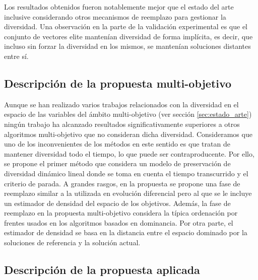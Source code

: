 Los resultados obtenidos fueron notablemente mejor que el estado del arte inclusive considerando otros mecanismos de 
reemplazo para gestionar la diversidad.
%
Una observación en la parte de la validación experimental es que el conjunto de vectores elite mantenían diversidad de 
forma implícita, es decir, que incluso sin forzar la diversidad en los mismos, se mantenían soluciones distantes entre sí.

\subsection{Descripción de la propuesta multi-objetivo}

Aunque se han realizado varios trabajos relacionados con la diversidad en el espacio de las variables del 
ámbito multi-objetivo (ver sección \ref{sec:estado_arte}) ningún trabajo ha alcanzado resultados significativamente superiores 
a otros algoritmos multi-objetivo que no consideran dicha diversidad.
%
Consideramos que uno de los inconvenientes de los métodos en este sentido es que tratan de mantener diversidad todo el tiempo,
lo que puede ser contraproducente.
%
Por ello, se propone el primer método que considera un modelo de preservación de diversidad dinámico lineal donde se toma
en cuenta el tiempo transcurrido y el criterio de parada.
%
A grandes rasgos, en la propuesta se propone una fase de reemplazo similar a la utilizada en evolución diferencial pero al que se
le incluye un estimador de densidad del espacio de los objetivos.
%
Además, la fase de reemplazo en la propuesta multi-objetivo considera la típica ordenación por frentes usados en los algoritmos
basados en dominancia.
%
Por otra parte, el estimador de densidad se basa en la distancia entre el espacio dominado por la soluciones de referencia y 
la solución actual.

\subsection{Descripción de la propuesta aplicada}

